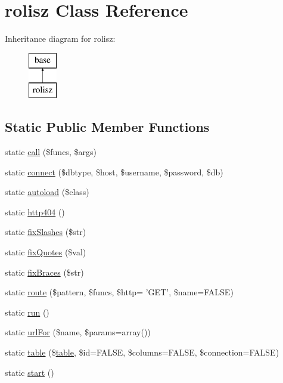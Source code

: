 \hypertarget{classrolisz}{
\section{rolisz Class Reference}
\label{classrolisz}
}
Inheritance diagram for rolisz:\begin{figure}[H]
\begin{center}
\leavevmode
\includegraphics[height=2.000000cm]{classrolisz}
\end{center}
\end{figure}
\subsection*{Static Public Member Functions}
\begin{DoxyCompactItemize}
\item 
static \hyperlink{classrolisz_af732c33c326c863efe6dd2cccb21a9a5}{call} (\$funcs, \$args)
\item 
static \hyperlink{classrolisz_a7cee6d5c562bcb595bc9d826910d248d}{connect} (\$dbtype, \$host, \$username, \$password, \$db)
\item 
static \hyperlink{classrolisz_ab4c022bf9d3474583030f31894865182}{autoload} (\$class)
\item 
static \hyperlink{classrolisz_a6fdc4c9fc517c619d860c7e91d17b02d}{http404} ()
\item 
static \hyperlink{classrolisz_a13d0c0500b75a5bdd849a4a55ba8e2b1}{fixSlashes} (\$str)
\item 
static \hyperlink{classrolisz_a031dd360aea86d999059dbfd18687973}{fixQuotes} (\$val)
\item 
static \hyperlink{classrolisz_ab8e0e9e5ffd59108f38efefe79511c5b}{fixBraces} (\$str)
\item 
static \hyperlink{classrolisz_aafd29366ef6399da1dd079fc131d8858}{route} (\$pattern, \$funcs, \$http= 'GET', \$name=FALSE)
\item 
static \hyperlink{classrolisz_ad3a572002fd350672b531756f7306e8f}{run} ()
\item 
static \hyperlink{classrolisz_a2c24b81993e81c6401edd6c4caff0336}{urlFor} (\$name, \$params=array())
\item 
static \hyperlink{classrolisz_ac871964dd21bf398baa7f61ecea0b895}{table} (\$\hyperlink{classtable}{table}, \$id=FALSE, \$columns=FALSE, \$connection=FALSE)
\item 
static \hyperlink{classrolisz_a146085d0f3a9d17bdcd7f3d4081d8c0d}{start} ()
\end{DoxyCompactItemize}


